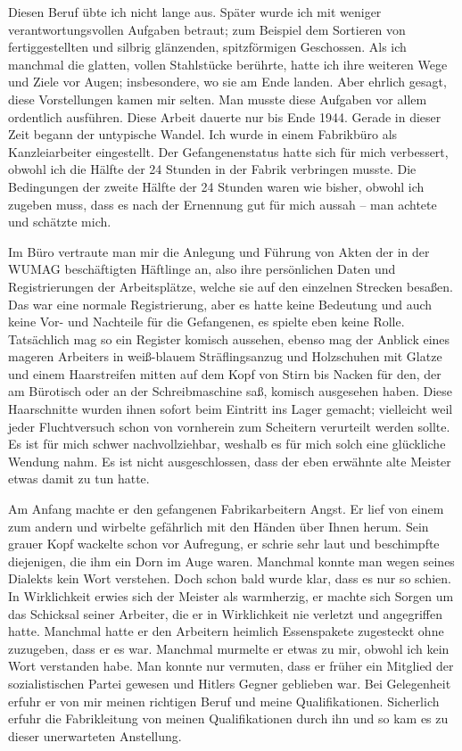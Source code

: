 Diesen Beruf übte ich nicht lange aus. Später wurde ich mit weniger verantwortungsvollen Aufgaben betraut; zum Beispiel dem Sortieren von fertiggestellten und silbrig glänzenden, spitzförmigen Geschossen. Als ich manchmal die glatten, vollen Stahlstücke berührte, hatte ich ihre weiteren Wege und Ziele vor Augen; insbesondere, wo sie am Ende landen. Aber ehrlich gesagt, diese Vorstellungen kamen mir selten. 
Man musste diese Aufgaben vor allem ordentlich ausführen. Diese Arbeit dauerte nur bis Ende 1944. Gerade in dieser Zeit begann der untypische Wandel. Ich wurde in einem Fabrikbüro als Kanzleiarbeiter eingestellt. Der Gefangenenstatus hatte sich für mich verbessert, obwohl ich die Hälfte der 24 Stunden in der Fabrik verbringen musste. Die Bedingungen der zweite Hälfte der 24 Stunden waren wie bisher, obwohl ich zugeben muss, dass es nach der Ernennung gut für mich aussah -- man achtete und schätzte mich.

Im Büro vertraute man mir die Anlegung und Führung von Akten der in der WUMAG beschäftigten Häftlinge an, also ihre persönlichen Daten und Registrierungen der Arbeitsplätze, welche sie auf den einzelnen Strecken besaßen. Das war eine normale Registrierung, aber es hatte keine Bedeutung und auch keine Vor- und Nachteile für die Gefangenen, es spielte eben keine Rolle.
Tatsächlich mag so ein Register komisch aussehen, ebenso mag der Anblick eines mageren Arbeiters in weiß-blauem Sträflingsanzug und Holzschuhen mit Glatze und einem Haarstreifen mitten auf dem Kopf von Stirn bis Nacken für den, der am Bürotisch oder an der Schreibmaschine saß, komisch ausgesehen haben. Diese Haarschnitte wurden ihnen sofort beim Eintritt ins Lager gemacht; vielleicht weil jeder Fluchtversuch schon von vornherein zum Scheitern verurteilt werden sollte.
Es ist für mich schwer nachvollziehbar, weshalb es für mich solch eine glückliche Wendung nahm. Es ist nicht ausgeschlossen, dass der eben erwähnte alte Meister etwas damit zu tun hatte.

Am Anfang machte er den gefangenen Fabrikarbeitern Angst. Er lief von einem zum andern und wirbelte gefährlich mit den Händen über Ihnen herum. Sein grauer Kopf wackelte schon vor Aufregung, er schrie sehr laut und beschimpfte diejenigen, die ihm ein Dorn im Auge waren. Manchmal konnte man wegen seines Dialekts kein Wort verstehen. Doch schon bald wurde klar, dass es nur so schien. 
In Wirklichkeit erwies sich der Meister als warmherzig, er machte sich Sorgen um das Schicksal seiner Arbeiter, die er in Wirklichkeit nie verletzt und angegriffen hatte. Manchmal hatte er den Arbeitern heimlich Essenspakete zugesteckt ohne zuzugeben, dass er es war. Manchmal murmelte er etwas zu mir, obwohl ich kein Wort verstanden habe. Man konnte nur vermuten, dass er früher ein Mitglied der sozialistischen Partei gewesen und Hitlers Gegner geblieben war. Bei Gelegenheit erfuhr er von mir  meinen richtigen Beruf und meine Qualifikationen. Sicherlich erfuhr die Fabrikleitung von meinen Qualifikationen durch ihn und so kam es zu dieser unerwarteten Anstellung.

